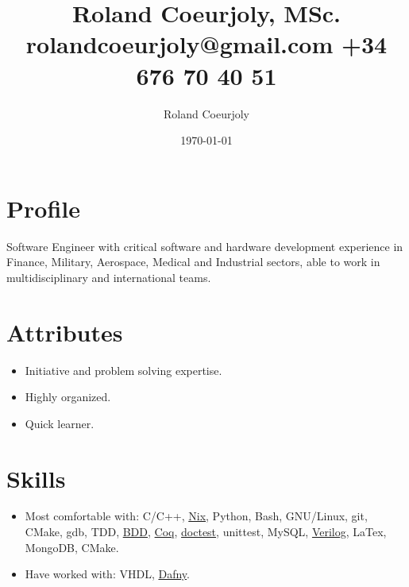 \documentclass[11pt]{article}
\author{Roland Coeurjoly}
\date{\today}
\title{Roland Coeurjoly, MSc.\\\medskip
\large rolandcoeurjoly@gmail.com +34 676 70 40 51}
\begin{document}
\maketitle
\section*{Profile}
\label{sec:orga8b728e}
Software Engineer with critical software and hardware development experience in Finance, Military, Aerospace, Medical and Industrial sectors, able to work in multidisciplinary and international teams.\\[0pt]
\section*{Attributes}
\label{sec:orgbba7f9b}
\begin{itemize}
\item Initiative and problem solving expertise.\\[0pt]
\item Highly organized.\\[0pt]
\item Quick learner.\\[0pt]
\end{itemize}
\section*{Skills}
\label{sec:orge09e392}
\begin{itemize}
\item Most comfortable with: C/C++, \href{https://nixos.org/}{Nix}, Python, Bash, GNU/Linux, git, CMake, gdb, TDD, \href{https://www.agilealliance.org/glossary/bdd/}{BDD}, \href{https://coq.inria.fr/}{Coq}, \href{https://github.com/onqtam/doctest}{doctest}, unittest, MySQL, \href{https://github.com/RCoeurjoly/Space-Invaders}{Verilog}, LaTex, MongoDB, CMake.\\[0pt]
\item Have worked with: VHDL, \href{https://dafny.org/}{Dafny}.\\[0pt]
\end{itemize}
\end{document}
